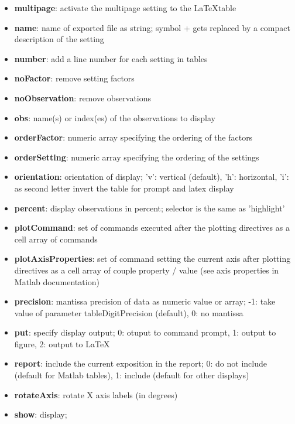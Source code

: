 \documentclass[a4paper,fleqn]{tufte-handout}
\begin{document}
\begin{itemize}
\item \textbf{multipage}:   activate the multipage setting to the \LaTeX table 
\item \textbf{name}:   name of exported file as string; 
    	symbol + gets replaced by a compact description of the setting              
\item \textbf{number}:  add a line number for each setting in tables                
\item \textbf{noFactor}:  remove setting factors 
\item \textbf{noObservation}: remove observations                 
\item \textbf{obs}: name(s) or index(es) of the observations to display                 
\item \textbf{orderFactor}:   numeric array specifying the ordering of the factors
\item \textbf{orderSetting}:    numeric array specifying the ordering of the settings              
\item \textbf{orientation}:  orientation of display;
    	'v': vertical (default),
    	'h': horizontal,
       'i': as second letter invert the table for prompt and latex
           display                
\item \textbf{percent}: display observations in percent;
    	selector is the same as 'highlight'  
\item \textbf{plotCommand}:  set of commands executed after the plotting
       directives as a cell array of commands                  
\item \textbf{plotAxisProperties}: set of command setting the current axis after plotting
       directives as a cell array of couple property / value (see axis properties in Matlab documentation)  
\item \textbf{precision}:  mantissa precision of data as numeric value or array;
           -1: take value of  parameter tableDigitPrecision (default),
           0: no mantissa                  
\item \textbf{put}: specify display output;
    	0: otuput to command prompt,
    	1: output to figure,
    	2: output to \LaTeX 
\item \textbf{report}:  include the current exposition in the report;
       0: do not include (default for Matlab tables),  
       1: include (default for other displays)                   
\item \textbf{rotateAxis}: rotate X axis labels (in degrees)   
\item \textbf{show}: display;

\end{itemize}
\end{document}
